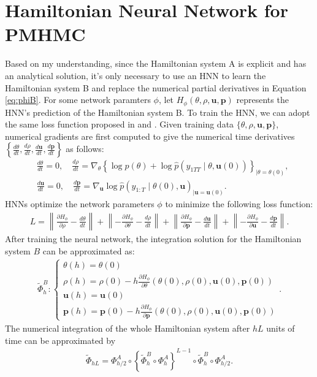 \documentclass[11pt,a4paper]{article}
\theoremstyle{remark}
\begin{document}
\section{Hamiltonian Neural Network for PMHMC}
\label{sec:hnn}
Based on my understanding, since the Hamiltonian system A is explicit and has an analytical solution, it's only necessary to use an HNN to learn the Hamiltonian system B and replace the numerical partial derivatives in Equation \eqref{eq:phiB}.  For some network paramters $\phi$, let $H_\phi(\theta, \rho, \mathbf{u}, \mathbf{p})$ represents the HNN's prediction of the Hamiltonian system B. To train the HNN, we can adopt the same loss function proposed in \cite{greydanus2019hamiltonian} and \cite{dhulipala2023efficient}. Given training data $\{\theta, \rho, \mathbf{u}, \mathbf{p}\}$, numerical gradients are first computed to give the numerical time derivatives $\left\{\frac{d \theta}{d t}, \frac{d \rho}{d t}, \frac{d \mathbf{u}}{d t}, \frac{d \mathbf{p}}{d t}\right\}$ as follows:
\begin{align}
	&\frac{d \theta}{d t} = 0, \quad \frac{d \rho}{d t} =  \nabla_\theta\left\{\log p(\theta)+\log \hat{p}\left(y_{1 T T} \mid \theta, \mathbf{u}(0)\right)\right\}_{\mid \theta=\theta(0)} ,\\
	&\frac{d \mathbf{u}}{d t} = 0, \quad \frac{d \mathbf{p}}{d t} = \nabla_{\mathbf{u}} \log \hat{p}\left(y_{1: T} \mid \theta(0), \mathbf{u}\right)_{\mid \mathbf{u}=\mathbf{u}(0)}.
\end{align}
HNNs optimize the network parameters $\phi$ to minimize the following loss function:
\begin{align}
	L=\left\|\frac{\partial H_\phi}{\partial \rho}-\frac{d \theta}{d t}\right\|+\left\|-\frac{\partial H_\phi}{\partial \theta}-\frac{d \rho}{d t}\right\| + \left\|\frac{\partial H_\phi}{\partial \mathbf{p}}-\frac{d \mathbf{u}}{d t}\right\|+\left\|-\frac{\partial H_\phi}{\partial \mathbf{u}}-\frac{d \mathbf{p}}{d t}\right\|.
\end{align}
After training the neural network, the integration solution for the Hamiltonian system $B$ can be approximated as:
\begin{align}
\label{eq:phiBapprox}
	\tilde{\Phi}_h^B:\left\{\begin{array}{l}
\theta(h)=\theta(0) \\
\rho(h)=\rho(0) - h \frac{\partial H_\phi}{\partial \theta} (\theta (0), \rho(0), \mathbf{u}(0), \mathbf{p}(0))\\
\mathbf{u}(h)=\mathbf{u}(0) \\
\mathbf{p}(h)=\mathbf{p}(0)- h \frac{\partial H_{\phi}}{\partial \mathbf{p}} (\theta (0), \rho(0), \mathbf{u}(0), \mathbf{p}(0))
\end{array}\right. .
\end{align}
The numerical integration of the whole Hamiltonian system after $hL$ units of time can be approximated by 
\begin{align}
\label{eq:integratorapprox}
	\tilde{\Phi}_{h L}=\Phi_{h / 2}^A \circ\left\{\tilde{\Phi}_h^B \circ \Phi_h^A\right\}^{L-1} \circ \tilde{\Phi}_h^B \circ \Phi_{h / 2}^A.
\end{align}
\end{document}
